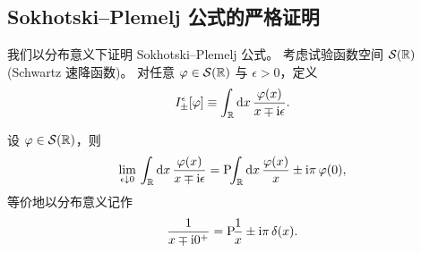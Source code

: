 \subsection{Sokhotski--Plemelj 公式的严格证明}

我们以分布意义下证明 Sokhotski--Plemelj 公式。
考虑试验函数空间 $\mathcal S(\mathbb{R})$ (Schwartz 速降函数)。
对任意 $\varphi\in\mathcal S(\mathbb{R})$ 与 $\epsilon>0$，定义
\begin{equation}\label{eq:G-SP-Iepsilon}
  I_\pm^\epsilon[\varphi]
  \equiv \int_{\mathbb{R}}\mathrm{d} x\,\frac{\varphi(x)}{x\mp\mathrm{i}\epsilon}.
\end{equation}

\begin{theorem}\label{thm:G-SokhotskiPlemelj}
设 $\varphi\in\mathcal S(\mathbb{R})$，则
\begin{equation}\label{eq:G-SP}
  \lim_{\epsilon\downarrow 0}\,
  \int_{\mathbb{R}}\mathrm{d} x\,\frac{\varphi(x)}{x\mp\mathrm{i}\epsilon}
  = \mathrm{P}\!\!\int_{\mathbb{R}}\mathrm{d} x\,\frac{\varphi(x)}{x}
  \pm\mathrm{i}\pi\,\varphi(0),
\end{equation}
等价地以分布意义记作
\begin{equation}\label{eq:G-SP-distribution}
  \frac{1}{x\mp\mathrm{i} 0^+}
  = \mathrm{P}\!\frac{1}{x} \pm \mathrm{i}\pi\,\delta(x).
\end{equation}
\end{theorem}

